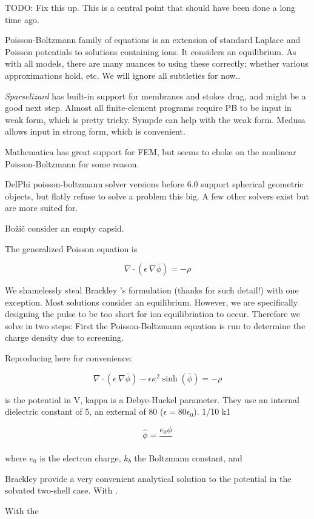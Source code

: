 \documentclass[paper.tex]{subfiles}
\begin{document}
\begin{autem}
	TODO: Fix this up. This is a central point that should have been done a long time ago. 
\end{autem}

Poisson-Boltzmann family of equations is an extension of standard Laplace and Poisson potentials to solutions containing ions. It considers an equilibrium. As with all models, there are many nuances to using these correctly; whether various approximations hold, etc. We will ignore all subtleties for now.. 

\textit{Sparselizard} has built-in support for membranes and stokes drag, and might be a good next step. Almost all finite-element programs require PB to be input in weak form, which is pretty tricky. Sympde can help with the weak form. Medusa allows input in strong form, which is convenient.

Mathematica has great support for FEM, but seems to choke on the nonlinear Poisson-Boltzmann for some reason. 

DelPhi poisson-boltzmann solver versions before 6.0 support spherical geometric objects, but flatly refuse to solve a problem this big. A few other solvers exist but are more suited for.

Božič \cite{How2012} consider an empty capsid.

The generalized Poisson equation is 

$$\nabla \cdot \left(\epsilon\ \nabla \bar\phi \right) = - \rho$$

We shamelessly steal Brackley \cite{Electrostatic2020}'s formulation (thanks for such detail!) with one exception. Most solutions consider an equilibrium. However, we are specifically designing the pulse to be too short for ion equilibriation to occur. Therefore we solve in two steps: First the Poisson-Boltzmann equation is run to determine the charge density due to screening.



Reproducing here for convenience:

$$\nabla \cdot \left(\epsilon\ \nabla \bar\phi \right) - \epsilon \kappa^2 \sinh(\bar\phi) = - \rho$$ 

is the potential in V, kappa is a Debye-Huckel parameter. They use an internal dielectric constant of 5, an external of 80 ($\epsilon =  80\epsilon_0$). 1/10 k1

$$\hat\phi = \frac{e_0 \phi}{}$$

where $e_0$ is the electron charge, $k_b$ the Boltzmann constant, and 

Brackley provide a very convenient analytical solution to the potential in the solvated two-shell case. With \cite{Deformation1991} \cite{Electrostatic2013}.

With the 
\end{document}
